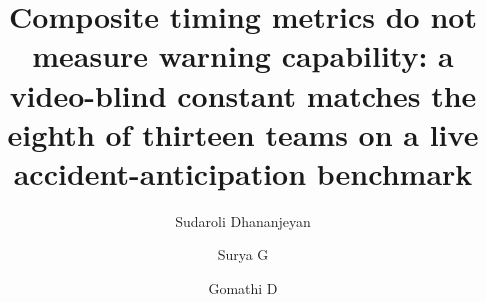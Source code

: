 \documentclass[review,3p,authoryear]{elsarticle}
\begin{document}
\begin{frontmatter}

\title{Composite timing metrics do not measure warning capability: a video-blind
constant matches the eighth of thirteen teams on a live accident-anticipation
benchmark}

\author[a]{Sudaroli Dhananjeyan}
\author[b]{Surya G}
\author[b]{Gomathi D}

\address[a]{Independent Researcher, Bengaluru, India}
\address[b]{T. John Institute of Technology, Bengaluru, India}



\end{frontmatter}





\end{document}
